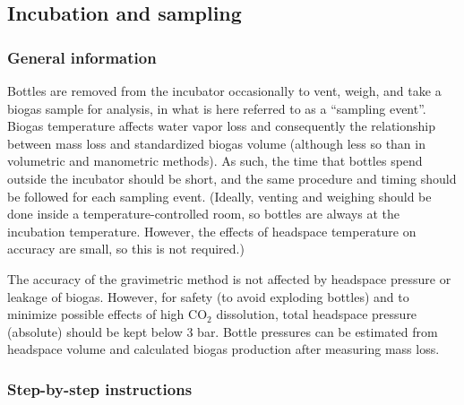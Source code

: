 \documentclass[]{article}
\begin{document}
\subsection{Incubation and sampling}

\subsubsection*{General information}

Bottles are removed from the incubator occasionally to vent, weigh, and take a biogas sample for analysis, in what is here referred to as a “sampling event”. Biogas temperature affects water vapor loss and consequently the relationship between mass loss and standardized biogas volume (although less so than in volumetric and manometric methods). As such, the time that bottles spend outside the incubator should be short, and the same procedure and timing should be followed for each sampling event. (Ideally, venting and weighing should be done inside a temperature-controlled room, so bottles are always at the incubation temperature. However, the effects of headspace temperature on accuracy are small, so this is not required.)

The accuracy of the gravimetric method is not affected by headspace pressure or leakage of biogas. However, for safety (to avoid exploding bottles) and to minimize possible effects of high CO$_2$ dissolution, total headspace pressure (absolute) should be kept below 3 bar. Bottle pressures can be estimated from headspace volume and calculated biogas production after measuring mass loss.

\subsubsection*{Step-by-step instructions}
\end{document}
